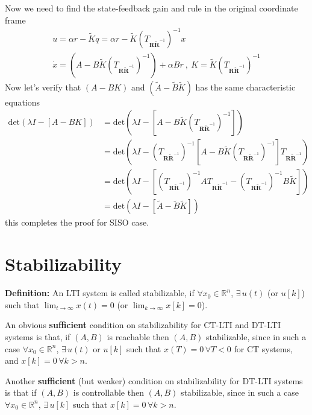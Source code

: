 \documentclass[twoside]{article}
\begin{document}
%
Now we need to find the state-feedback gain and rule in the original coordinate frame
\begin{align*}
 u = \alpha r - \tilde{K} q = \alpha r - \tilde{K} \left( T_{\mathbf{R} \tilde{\mathbf{R}}^{-1}} \right)^{-1} x     
 \\
 \dot{x} = \left( A - B \tilde{K} \left( T_{\mathbf{R} \tilde{\mathbf{R}}^{-1}} \right)^{-1} \right) + \alpha B r \ , \ K = \tilde{K} \left( T_{\mathbf{R} \tilde{\mathbf{R}}^{-1}} \right)^{-1}
\end{align*} 
%
Now let's verify that $(A - B K)$ and $( \tilde{A} - \tilde{B} \tilde{K} )$ has the same characteristic equations
%
\begin{align*}
 \mathrm{det}( \lambda I - \left[ A - B K \right] ) &=
 \mathrm{det}\left( \lambda I - \left[ A - B \tilde{K} \left( T_{\mathbf{R} \tilde{\mathbf{R}}^{-1}} \right)^{-1} \right] \right) 
 \\
 &= \mathrm{det}\left( \lambda I - \left( T_{\mathbf{R} \tilde{\mathbf{R}}^{-1}} \right)^{-1} 
 \left[ A - B \tilde{K} \left( T_{\mathbf{R} \tilde{\mathbf{R}}^{-1}} \right)^{-1} \right] 
T_{\mathbf{R} \tilde{\mathbf{R}}^{-1}} 
 \right) 
 \\
 &= \mathrm{det}\left( \lambda I -
 \left[ \left( T_{\mathbf{R} \tilde{\mathbf{R}}^{-1}} \right)^{-1}  A T_{\mathbf{R} \tilde{\mathbf{R}}^{-1}} - \left( T_{\mathbf{R} \tilde{\mathbf{R}}^{-1}} \right)^{-1}  B \tilde{K}  \right] 
 \right) 
 \\
 &= \mathrm{det}\left( \lambda I - \left[ \tilde{A} - \tilde{B} \tilde{K} \right] \right)
\end{align*} 
%
this completes the proof for SISO case.

 \section{Stabilizability}

 \textbf{Definition:} An LTI system is called stabilizable, if 
 $\forall x_0 \in \mathbb{R}^{n}$, $\exists \, u(t)$ (or $u[k]$) such that
 $\lim_{t\to\infty} x(t) = 0$ (or $\lim_{k\to\infty} x[k] = 0$).

 An obvious \textbf{sufficient} condition on stabilizability for CT-LTI and DT-LTI systems is that, if $(A,B)$ is reachable then $(A,B)$ stabilizable, since
 in such a case $\forall x_0 \in \mathbb{R}^{n}$, $\exists \, u(t)$ or $u[k]$
 such that $x(T) = 0 \, \forall T < 0$ for CT systems, and $x[k] = 0 \, \forall  k > n$. 

Another \textbf{sufficient} (but weaker) condition on stabilizability for DT-LTI systems is that if $(A,B)$ is controllable then $(A,B)$ stabilizable, since
 in such a case $\forall x_0 \in \mathbb{R}^{n}$, $\exists \, u[k]$
 such that $x[k] = 0 \, \forall  k > n$. 
\end{document}
